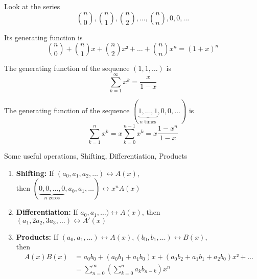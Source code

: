 \documentclass[english]{lbscript}
\begin{document}
\begin{example}{}{}
  Look at the series
  \begin{equation}
    \label{eq:24}
    \binom{n}{0}, \binom{n}{1}, \binom{n}{2}, \dots, \binom{n}{n}, 0, 0, \dots
  \end{equation}

  Its generating function is
  \begin{equation}
    \label{eq:25}
    \binom{n}{0} + \binom{n}{1}x + \binom{n}{2}x² + \dots + \binom{n}{n} x^{n} = (1+x)^{n}
  \end{equation}
\end{example}
\begin{example}{}{}
  The generating function of the sequence \((1, 1, \dots )\) is
  \begin{equation}
    \label{eq:26}
    ∑_{k=1}^{∞} x^{k} = \frac{x}{1-x}
  \end{equation}
\end{example}
\begin{example}{}{}
  The generating function of the sequence \((\underbrace{1, \dots, 1}_{n \text{ times}}, 0, 0, \dots)\) is
  \begin{equation}
    \label{eq:27}
    ∑_{k=1}^{n} x^{k} =x ∑_{k=0}^{n-1} x^{k} = x \frac{1 - x^{n}}{1-x}
  \end{equation}
\end{example}
\begin{definition}{Some useful operations, Shifting, Differentiation, Products}{}
  \begin{enumerate}
    \item\label{item:7} \textbf{Shifting:} If \((a_0, a_1, a_2, \dots) \leftrightarrow A(x)\),\\
    then \((\underbrace{0, 0, \dots, 0}_{n \text{ zeros}}, a_0, a_1, \dots) \leftrightarrow x^{n} A(x)\)
    \item\label{item:8} \textbf{Differentiation:} If \(a_0, a_1, \dots) \leftrightarrow A(x)\), then \\
    \((a_1, 2a_2, 3a_3, \dots) \leftrightarrow A'(x)\)
    \item\label{item:9} \textbf{Products:} If \((a_0, a_1, \dots)\leftrightarrow A(x), (b_0, b_1, \dots) \leftrightarrow B\left(x \right)  \), \\
    then
    \begin{align}
      \label{eq:29}
      A(x)B(x)
       & = a_0b_0 + (a_0b_1 + a_1b_0)x + (a_0b_2+a_1b_1+a_2b_0)x² + \dots \\
       & = ∑_{n=0}^{∞} \left(∑_{k=0}^{n} a_k b_{n-k} \right) x^{n}
    \end{align}
  \end{enumerate}
\end{definition}
\end{document}
